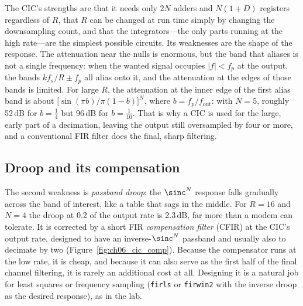 
The CIC's strengths are that it needs only $2N$ adders and $N(1+D)$ registers regardless of $R$,
that $R$ can be changed at run time simply by changing the downsampling count, and that the
integrators---the only parts running at the high rate---are the simplest possible circuits. Its
weaknesses are the shape of the response. The attenuation near the nulls is enormous, but the band
that aliases is not a single frequency: when the wanted signal occupies $|f|<f_p$ at the output, the
bands $kf_s/R\pm f_p$ all alias onto it, and the attenuation at the edges of those bands is limited.
For large $R$, the attenuation at the inner edge of the first alias band is about
$\bigl[\sin(\pi b)/\pi(1-b)\bigr]^N$, where $b=f_p/f_{\text{out}}$: with $N=5$, roughly 52\,dB for
$b=\tfrac14$ but 96\,dB for $b=\tfrac1{10}$. That is why a CIC is used for the large, early part of a
decimation, leaving the output still oversampled by four or more, and a conventional FIR filter does
the final, sharp filtering.

\subsection{Droop and its compensation}

The second weakness is \emph{passband droop}: the $\sinc^N$ response falls gradually across the
band of interest, like a table that sags in the middle. For $R=16$ and $N=4$ the droop at 0.2 of the
output rate is 2.3\,dB, far more than a modem can tolerate. It is corrected by a short FIR
\emph{compensation filter} (CFIR) at the CIC's output rate, designed to have an inverse-$\sinc^N$
passband and usually also to decimate by two (Figure~\ref{fig:ch06_cic_comp}). Because the
compensator runs at the low rate, it is cheap, and because it can also serve as the first half of
the final channel filtering, it is rarely an additional cost at all. Designing it is a natural job
for least squares or frequency sampling (\texttt{firls} or \texttt{firwin2} with the inverse droop
as the desired response), as in the lab.


